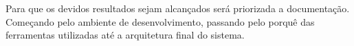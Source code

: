 \documentclass[graduacao,brazil]{ThesisPUC}
\begin{document}
Para que os devidos resultados sejam alcan\c{c}ados ser\'{a} priorizada a documenta\c{c}\~{a}o. Come\c{c}ando pelo ambiente de desenvolvimento, passando pelo porqu\^{e} das ferramentas utilizadas at\'{e} a arquitetura final do sistema.


\arial
\nocite{*} %


\normalfont
%


\end{document}
